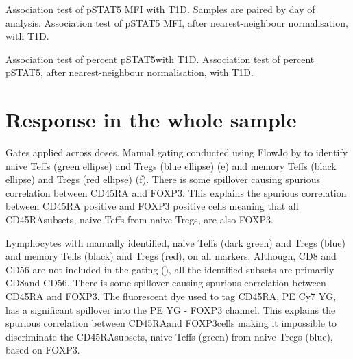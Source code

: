 
{ Association test of pSTAT5 MFI with T1D. }
{
  Samples are paired by day of analysis.
}
{ Association test of pSTAT5 MFI, after nearest-neighbour normalisation, with T1D. }
{ }
{ }

{ Association test of percent pSTAT5\positive with T1D. }
{ }
{ Association test of percent pSTAT5\positive, after nearest-neighbour normalisation, with T1D. }
{ } 


\section{Response in the whole sample}

{ Gates applied across doses. }
{
Manual gating conducted using FlowJo by  to identify
naive Teffs (green ellipse) and Tregs (blue ellipse) (e)
and memory Teffs (black ellipse) and Tregs (red ellipse) (f).
There is some spillover causing spurious correlation between CD45RA and FOXP3.
This explains the spurious correlation between CD45RA positive and FOXP3 positive cells meaning that all CD45RA\positive subsets, naive Teffs from naive Tregs, are also FOXP3\positive.
}

{ Lymphocytes with manually identified, naive Teffs (dark green) and Tregs (blue) and memory Teffs (black) and Tregs (red), on all markers.  }
{
    Although, CD8 and CD56 are not included in the gating (), all the identified subsets are primarily CD8\negative and CD56\positive.
    There is some spillover causing spurious correlation between CD45RA and FOXP3.
    The fluorescent dye used to tag CD45RA, PE Cy7 YG, has a significant spillover into the PE YG - FOXP3 channel.
    This explains the spurious correlation between CD45RA\positive and FOXP3\positive cells making it impossible to discriminate
    the CD45RA\positive subsets, naive Teffs (green) from naive Tregs (blue), based on FOXP3.  
}

